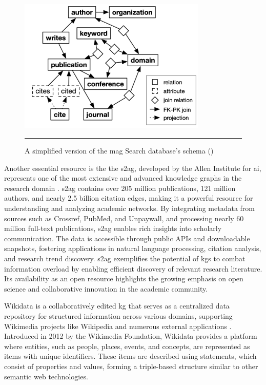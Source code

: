\begin{figure}[htbp]
    \centering
 \includegraphics[width=0.8\textwidth]{03_Figures/literature-review/mag-schema.png}
     \rule{35em}{0.5pt}
    \caption{A simplified version of the \gls{mag} Search database's schema (\textcite{Baik2019})} 
 \label{fig:mag-schema}
\end{figure}

Another essential resource is the the \gls{s2ag}, developed by the Allen Institute for \acrlong{ai}, represents one of the most extensive and advanced knowledge graphs in the research domain \cite{S2AG}.
\gls{s2ag} contains over 205 million publications, 121 million authors, and nearly 2.5 billion citation edges, making it a powerful resource for understanding and analyzing academic networks.
By integrating metadata from sources such as Crossref, PubMed, and Unpaywall, and processing nearly 60 million full-text publications, \gls{s2ag} enables rich insights into scholarly communication.
The data is accessible through public APIs and downloadable snapshots, fostering applications in natural language processing, citation analysis, and research trend discovery.
\gls{s2ag} exemplifies the potential of \glspl{kg} to combat information overload by enabling efficient discovery of relevant research literature.
Its availability as an open resource highlights the growing emphasis on open science and collaborative innovation in the academic community.

Wikidata is a collaboratively edited \gls{kg} that serves as a centralized data repository for structured information across various domains, supporting Wikimedia projects like Wikipedia and numerous external applications \cite{Wikidata2014}.
Introduced in 2012 by the Wikimedia Foundation, Wikidata provides a platform where entities, such as people, places, events, and concepts, are represented as items with unique identifiers.
These items are described using statements, which consist of properties and values, forming a triple-based structure similar to other semantic web technologies.

